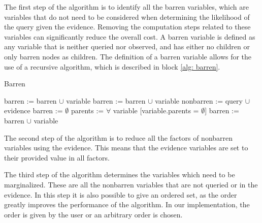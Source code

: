 \documentclass[a4paper]{article}
\begin{document}
The first step of the algorithm is to identify all the barren variables, which
are variables that do not need to be considered when determining the likelihood
of the query given the evidence. Removing the computation steps related to
these variables can significantly reduce the overall cost. A barren variable is
defined as any variable that is neither queried nor observed, and has either no
children or only barren nodes as children. The definition of a barren variable
allows for the use of a recursive algorithm, which is described in block
\ref{alg: barren}.

\begin{algorithm}
	\caption{Barren}
	\label{alg: barren}
	\begin{algorithmic}[1]
					\State {}
				\EndFor
				\State {}
			\EndIf
				\State barren := barren $\cup$ variable
				\State {}
			\EndIf
				\State barren := barren $\cup$ variable
				\State {}
			\EndIf
				\State {}
			\EndFor
			\State {}
		\EndFunction
			\State nonbarren := query $\cup$ evidence
			\State barren := $\emptyset$
			\State parents := $\forall$ variable [variable.parents =
			$\emptyset$]
					\State barren := barren $\cup$ variable
				\EndIf
			\EndFor
			\State {}
		\EndFunction
	\end{algorithmic}
\end{algorithm}

The second step of the algorithm is to reduce all the factors of nonbarren
variables using the evidence. This means that the evidence variables are set to
their provided value in all factors.

The third step of the algorithm determines the variables which need to be
marginalized. These are all the nonbarren variables that are not queried or in
the evidence. In this step it is also possible to give an ordered set, as the
order greatly improves the performance of the algorithm. In our implementation,
the order is given by the user or an arbitrary order is chosen.
\end{document}
